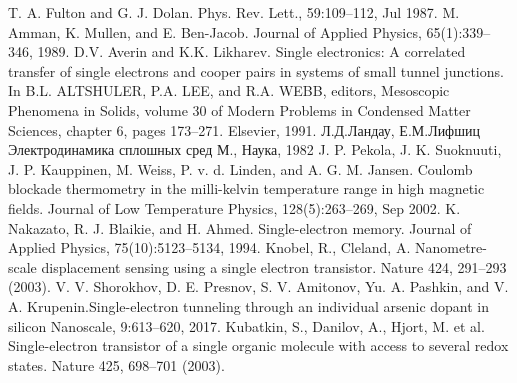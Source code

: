 \documentclass[12pt,a4paper]{report}
\begin{document}
\begin{thebibliography}{99}
	 T. A. Fulton and G. J. Dolan. Phys. Rev. Lett., 59:109–112, Jul 1987.
	M. Amman, K. Mullen, and E. Ben-Jacob. Journal of Applied Physics, 65(1):339–346,
1989.
	D.V. Averin and K.K. Likharev. Single electronics: A correlated transfer of single
electrons and cooper pairs in systems of small tunnel junctions. In B.L. ALTSHULER,
P.A. LEE, and R.A. WEBB, editors, Mesoscopic Phenomena in Solids, volume 30 of
Modern Problems in Condensed Matter Sciences, chapter 6, pages 173–271. Elsevier,
1991.
	Л.Д.Ландау, Е.М.Лифшиц Электродинамика сплошных сред М., Наука, 1982
	 J. P. Pekola, J. K. Suoknuuti, J. P. Kauppinen, M. Weiss, P. v. d. Linden, and A. G. M.
Jansen. Coulomb blockade thermometry in the milli-kelvin temperature range in high
magnetic fields. Journal of Low Temperature Physics, 128(5):263–269, Sep 2002.
	 K. Nakazato, R. J. Blaikie, and H. Ahmed. Single-electron memory. Journal of Applied
Physics, 75(10):5123–5134, 1994.
	 Knobel, R., Cleland, A. Nanometre-scale displacement sensing using a single electron transistor. Nature 424, 291–293 (2003).
	 V. V. Shorokhov, D. E. Presnov, S. V. Amitonov, Yu. A. Pashkin, and V. A. Krupenin.Single-electron tunneling through an individual arsenic dopant in silicon
Nanoscale, 9:613–620, 2017.
	 Kubatkin, S., Danilov, A., Hjort, M. et al. Single-electron transistor of a single organic molecule with access to several redox states. Nature 425, 698–701 (2003).
\end{thebibliography}
\end{document}
